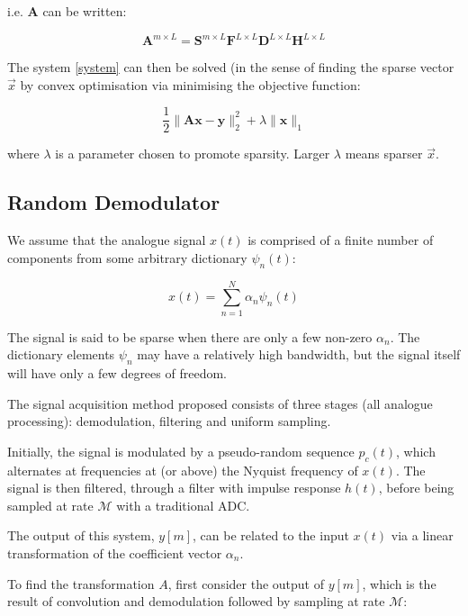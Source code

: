 i.e. \(\textbf{A}\) can be written: 

\begin{equation}
\textbf{A}^{m\times L} = \textbf{S}^{m\times L} \textbf{F}^{L\times L} \textbf{D}^{L \times L} \textbf{H}^{L \times L}
\end{equation}

The system  \ref{system} can then be solved (in the sense of finding the sparse vector \(\vec{x}\) by convex optimisation via minimising the objective function:

\begin{equation}
\frac{1}{2}\|\textbf{Ax}-\textbf{y}\|_2^2 + \lambda \|\textbf{x}\|_1
\end{equation}

where \(\lambda\) is a parameter chosen to promote sparsity. Larger \(\lambda\) means sparser \(\vec{x}\).

\subsection{Random Demodulator}
We assume that the analogue signal \(x\left(t\right)\) is comprised of a finite number of components from some arbitrary dictionary \(\psi_n\left(t\right)\):

\begin{equation}
x\left(t\right) = \sum_{n=1}^N \alpha_n \psi_n\left(t\right)
\end{equation}

The signal is said to be sparse when there are only a few non-zero \(\alpha_n\). The dictionary elements \(\psi_n\) may have a relatively high bandwidth, but the signal itself will have only a few degrees of freedom.

The signal acquisition method proposed consists of three stages (all analogue processing): demodulation, filtering and uniform sampling. 

Initially, the signal is modulated by a pseudo-random sequence \(p_c\left(t\right)\), which alternates at frequencies at (or above) the Nyquist frequency of \(x\left(t\right)\). The signal is then filtered, through a filter with impulse response \(h\left(t\right)\), before being sampled at rate \(\mathcal{M}\) with a traditional ADC.

The output of this system, \(y\left[m\right]\), can be related to the input \(x\left(t\right)\) via a linear transformation of the coefficient vector \(\alpha_n\). 

To find the transformation \(A\), first consider the output of \(y\left[m\right]\), which is the result of convolution and demodulation followed by sampling at rate \(\mathcal{M}\):

